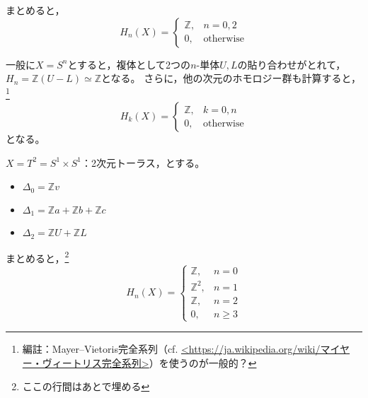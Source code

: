 \documentclass[uplatex]{jsarticle}
\begin{document}
\begin{rei}[球面のホモロジー群]
	まとめると，
	\begin{equation}
		H_{n}(X) = \begin{cases}
			\mathbb{Z}, & n=0, 2 \\
			0, & \text{otherwise}
		\end{cases}
	\end{equation}
\end{rei}

\begin{rei}[超球面のホモロジー群]
	一般に$X = S^{n}$とすると，複体として2つの$n$-単体$U,L$の貼り合わせがとれて，
	$H_{n} = \mathbb{Z} (U - L) \simeq \mathbb{Z}$となる。
	さらに，他の次元のホモロジー群も計算すると，\footnote{編註：Mayer–Vietoris完全系列（cf. \url{<https://ja.wikipedia.org/wiki/マイヤー・ヴィートリス完全系列>}）を使うのが一般的？}\
	\begin{equation}
		H_{k} (X) = \begin{cases}
			\mathbb{Z}, & k = 0, n \\
			0, & \text{otherwise}
		\end{cases}
	\end{equation}
	となる。
\end{rei}

\begin{rei}[トーラスのホモロジー群]
	$X = T^{2} = S^{1} \times S^{1}$：2次元トーラス，とする。
	\begin{center}
	\end{center}
	\begin{itemize}
		\vspace{-0.5\baselineskip}
		\item $\Delta_{0} = \mathbb{Z} v$
		\item $\Delta_{1} = \mathbb{Z} a + \mathbb{Z} b + \mathbb{Z} c$
		\item $\Delta_{2} = \mathbb{Z} U + \mathbb{Z} L$
	\end{itemize}
	まとめると，\footnote{ここの行間はあとで埋める}
	\begin{equation}
		H_{n}(X) = \begin{cases}
			\mathbb{Z}, & n=0 \\
			\mathbb{Z}^{2}, & n=1 \\
			\mathbb{Z}, & n=2 \\
			0, & n \ge 3
		\end{cases}
	\end{equation}
\end{rei}
\end{document}
